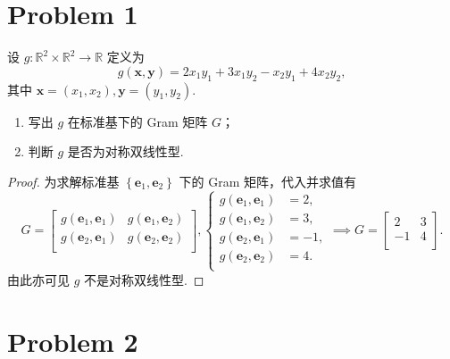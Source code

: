 \section*{Problem 1}

设 $g : \mathbb{R}^2 \times \mathbb{R}^2 \to \mathbb{R}$ 定义为
\[
g \left(\boldsymbol{x}, \boldsymbol{y}\right) = 2 x_1 y_1 + 3 x_1 y_2 - x_2 y_1 + 4 x_2 y_2,
\]
其中 $\boldsymbol{x} = \left(x_1, x_2\right), \boldsymbol{y} = \left(y_1, y_2\right)$.
\begin{enumerate}
    \item 写出 $g$ 在标准基下的 Gram 矩阵 $G$；
    \item 判断 $g$ 是否为对称双线性型.
\end{enumerate}

\begin{proof}
为求解标准基 $\left\{\boldsymbol{e}_1, \boldsymbol{e}_2\right\}$ 下的 Gram 矩阵，代入并求值有
\[
G = \begin{bmatrix}
    g \left(\boldsymbol{e}_1, \boldsymbol{e}_1\right) & g \left(\boldsymbol{e}_1, \boldsymbol{e}_2\right) \\
    g \left(\boldsymbol{e}_2, \boldsymbol{e}_1\right) & g \left(\boldsymbol{e}_2, \boldsymbol{e}_2\right) \\
\end{bmatrix},
\begin{cases}
    g \left(\boldsymbol{e}_1, \boldsymbol{e}_1\right) &= 2, \\
    g \left(\boldsymbol{e}_1, \boldsymbol{e}_2\right) &= 3, \\
    g \left(\boldsymbol{e}_2, \boldsymbol{e}_1\right) &= -1, \\
    g \left(\boldsymbol{e}_2, \boldsymbol{e}_2\right) &= 4. \\
\end{cases}
\implies G = \boxed{\begin{bmatrix}
    2 & 3 \\
    -1 & 4 \\
\end{bmatrix}}.
\]
由此亦可见 $\boxed{g \textrm{ 不是对称双线性型}}$.

\end{proof}

\section*{Problem 2}

